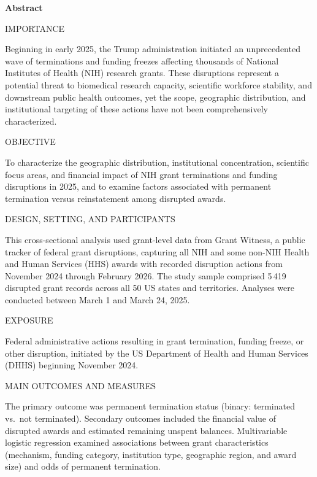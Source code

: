 \documentclass[10pt, letterpaper]{article}
\newcommand{\abslabel}[1]{%
  {\vspace{4pt}\noindent\sffamily\fontseries{b}\selectfont\fontsize{8.5}{10}\selectfont #1\enspace}%
}
\newcommand{\absrule}{%
  \vspace{3pt}\noindent{\color{jamacrimson}\rule{0.62\textwidth}{0.4pt}}\vspace{3pt}%
}
\begin{document}
\noindent
\begin{minipage}[t]{0.62\textwidth}
{\sffamily\bfseries\fontsize{11}{13}\selectfont\color{jamacrimson} Abstract\par}
\vspace{4pt}

\abslabel{IMPORTANCE}
{\fontsize{9}{11.5}\selectfont
Beginning in early 2025, the Trump administration initiated an unprecedented wave of terminations and funding freezes affecting thousands of National Institutes of Health (NIH) research grants. These disruptions represent a potential threat to biomedical research capacity, scientific workforce stability, and downstream public health outcomes, yet the scope, geographic distribution, and institutional targeting of these actions have not been comprehensively characterized.\par}

\absrule

\abslabel{OBJECTIVE}
{\fontsize{9}{11.5}\selectfont
To characterize the geographic distribution, institutional concentration, scientific focus areas, and financial impact of NIH grant terminations and funding disruptions in 2025, and to examine factors associated with permanent termination versus reinstatement among disrupted awards.\par}

\absrule

\abslabel{DESIGN, SETTING, AND PARTICIPANTS}
{\fontsize{9}{11.5}\selectfont
This cross-sectional analysis used grant-level data from Grant Witness, a public tracker of federal grant disruptions, capturing all NIH and some non-NIH Health and Human Services (HHS) awards with recorded disruption actions from November 2024 through February 2026. The study sample comprised 5\,419 disrupted grant records across all 50 US states and territories. Analyses were conducted between March 1 and March 24, 2025.\par}

\absrule

\abslabel{EXPOSURE}
{\fontsize{9}{11.5}\selectfont
Federal administrative actions resulting in grant termination, funding freeze, or other disruption, initiated by the US Department of Health and Human Services (DHHS) beginning November 2024.\par}

\absrule

\abslabel{MAIN OUTCOMES AND MEASURES}
{\fontsize{9}{11.5}\selectfont
The primary outcome was permanent termination status (binary: terminated vs.\ not terminated). Secondary outcomes included the financial value of disrupted awards and estimated remaining unspent balances. Multivariable logistic regression examined associations between grant characteristics (mechanism, funding category, institution type, geographic region, and award size) and odds of permanent termination.\par}


\end{minipage}
\end{document}

